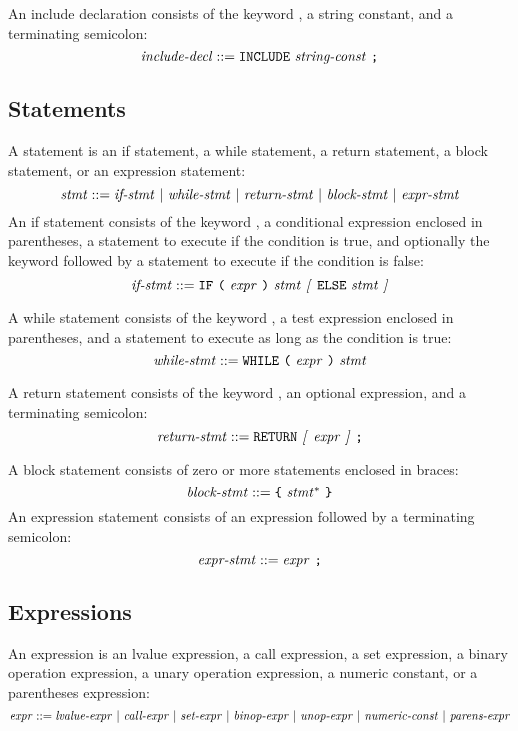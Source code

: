 \documentclass[10pt]{article}
\begin{document}
 An include declaration consists of the
keyword , a string constant, and a terminating semicolon:
%
$$\mbox{\textit{include-decl}} ::= \mbox{\texttt{INCLUDE}
  \ensuremath{\mbox{\textit{string-const}}} \texttt{;}}$$
%

\subsection{Statements}
\label{sec:syntax:statements}

A statement is an if statement, a while statement, a return statement,
a block statement, or an expression statement:
%
$$\mbox{\textit{stmt}} ::= \mbox{\ensuremath{\mbox{\textit{if-stmt}}} $|$ \ensuremath{\mbox{\textit{while-stmt}}}
  $|$ \ensuremath{\mbox{\textit{return-stmt}}} $|$ \ensuremath{\mbox{\textit{block-stmt}}} $|$
  \ensuremath{\mbox{\textit{expr-stmt}}}}$$
%
 An if statement consists of the keyword
, a conditional expression enclosed in parentheses, a
statement to execute if the condition is true, and optionally the
keyword  followed by a statement to execute if the condition
is false:
%
$$\mbox{\textit{if-stmt}} ::= \mbox{\texttt{IF} \texttt{(} \ensuremath{\mbox{\textit{expr}}} \texttt{)}
  \ensuremath{\mbox{\textit{stmt}}} \textit{[} \texttt{ELSE} \ensuremath{\mbox{\textit{stmt}}} \textit{]}}$$
%

 A while statement consists of the keyword
, a test expression enclosed in parentheses, and a
statement to execute as long as the condition is true:
%
$$\mbox{\textit{while-stmt}} ::= \mbox{\texttt{WHILE} \texttt{(} \ensuremath{\mbox{\textit{expr}}}
  \texttt{)} \ensuremath{\mbox{\textit{stmt}}}}$$
%

 A return statement consists of the keyword
, an optional expression, and a terminating semicolon:
%
$$\mbox{\textit{return-stmt}} ::= \mbox{\texttt{RETURN} \textit{[} \ensuremath{\mbox{\textit{expr}}} \textit{]}
    \texttt{;}}$$
%

 A block statement consists of zero or more
statements enclosed in braces:
%
$$\mbox{\textit{block-stmt}} ::= \mbox{\texttt{\{} \ensuremath{\mbox{\textit{stmt}}}$^*$
  \texttt{\}}}$$
%
 An expression statement consists of an
expression followed by a terminating semicolon:
%
$$\mbox{\textit{expr-stmt}} ::= \mbox{\ensuremath{\mbox{\textit{expr}}} \texttt{;}}$$
%

\subsection{Expressions}
\label{sec:syntax:expressions}

An expression is an lvalue expression, a call expression, a set
expression, a binary operation expression, a unary operation
expression, a numeric constant, or a parentheses expression:
%
$$\mbox{\textit{expr}} ::= \mbox{\ensuremath{\mbox{\textit{lvalue-expr}}} $|$
  \ensuremath{\mbox{\textit{call-expr}}} $|$ \ensuremath{\mbox{\textit{set-expr}}} $|$ \ensuremath{\mbox{\textit{binop-expr}}}
  $|$ \ensuremath{\mbox{\textit{unop-expr}}} $|$ \ensuremath{\mbox{\textit{numeric-const}}} $|$
  \ensuremath{\mbox{\textit{parens-expr}}}}$$
\end{document}
